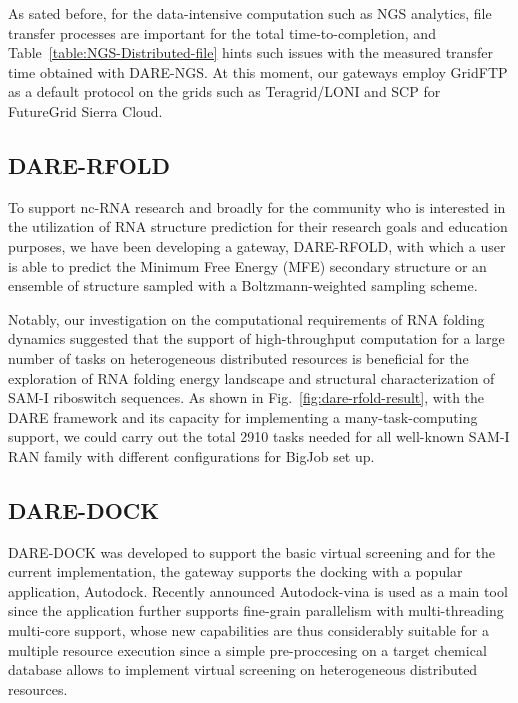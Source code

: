 \documentclass{sig-alternate}
\begin{document}
As sated before, for the data-intensive computation such as NGS
analytics, file transfer processes are important for the total
time-to-completion, and Table~\ref{table:NGS-Distributed-file} hints
such issues with the measured transfer time obtained with DARE-NGS.
At this moment, our gateways employ GridFTP as a default protocol on
the grids such as Teragrid/LONI and SCP for FutureGrid Sierra Cloud.

\subsection{DARE-RFOLD}
To support nc-RNA research and broadly for the community who is
interested in the utilization of RNA structure prediction for their
research goals and education purposes, we have been developing a
gateway, DARE-RFOLD, with which a user is able to predict the Minimum
Free Energy (MFE) secondary structure or an ensemble of structure
sampled with a Boltzmann-weighted sampling scheme.

Notably, our investigation on the computational requirements of RNA
folding dynamics suggested that the support of high-throughput
computation for a large number of tasks on heterogeneous distributed
resources is beneficial for the exploration of RNA folding energy
landscape and structural characterization of SAM-I riboswitch
sequences.  As shown in Fig.~\ref{fig:dare-rfold-result}, with the
DARE framework and its capacity for implementing a many-task-computing
support, we could carry out the total 2910 tasks needed for all
well-known SAM-I RAN family with different configurations for BigJob
set up\cite{ecmls10}.


\subsection{DARE-DOCK}
DARE-DOCK was developed to support the basic virtual screening and for
the current implementation, the gateway supports the docking with a
popular application, Autodock\cite{autodock}.  Recently announced
Autodock-vina is used as a main tool since the application further
supports fine-grain parallelism with multi-threading multi-core
support, whose new capabilities are thus considerably suitable for a
multiple resource execution since a simple pre-proccesing on a target
chemical database allows to implement virtual screening on
heterogeneous distributed resources\cite{autodock-vina}.

%
\end{document}
